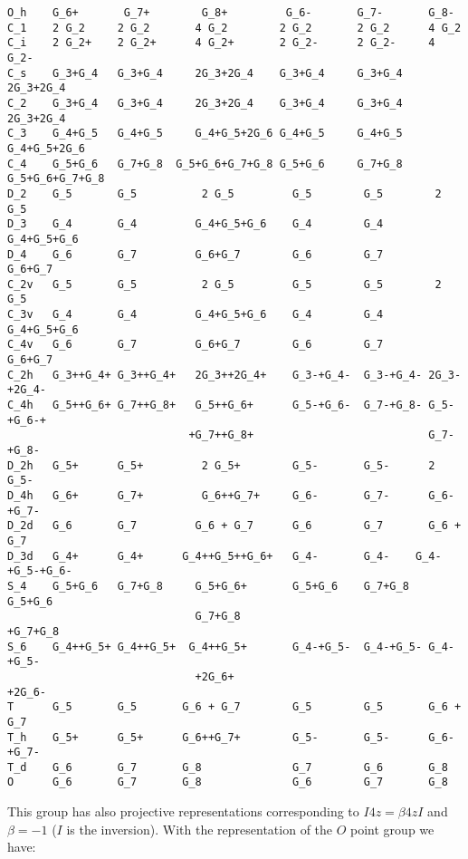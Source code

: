 \documentclass[12pt,a4paper,twoside]{report}
\begin{document}
\begin{tcolorbox}
\begin{scriptsize}
\begin{verbatim}
O_h    G_6+       G_7+        G_8+         G_6-       G_7-       G_8-
C_1    2 G_2     2 G_2       4 G_2        2 G_2       2 G_2      4 G_2
C_i    2 G_2+    2 G_2+      4 G_2+       2 G_2-      2 G_2-     4 G_2-
C_s    G_3+G_4   G_3+G_4     2G_3+2G_4    G_3+G_4     G_3+G_4   2G_3+2G_4
C_2    G_3+G_4   G_3+G_4     2G_3+2G_4    G_3+G_4     G_3+G_4   2G_3+2G_4
C_3    G_4+G_5   G_4+G_5     G_4+G_5+2G_6 G_4+G_5     G_4+G_5   G_4+G_5+2G_6
C_4    G_5+G_6   G_7+G_8  G_5+G_6+G_7+G_8 G_5+G_6     G_7+G_8 G_5+G_6+G_7+G_8
D_2    G_5       G_5          2 G_5         G_5        G_5        2 G_5
D_3    G_4       G_4         G_4+G_5+G_6    G_4        G_4       G_4+G_5+G_6
D_4    G_6       G_7         G_6+G_7        G_6        G_7       G_6+G_7
C_2v   G_5       G_5          2 G_5         G_5        G_5        2 G_5
C_3v   G_4       G_4         G_4+G_5+G_6    G_4        G_4       G_4+G_5+G_6
C_4v   G_6       G_7         G_6+G_7        G_6        G_7       G_6+G_7
C_2h   G_3++G_4+ G_3++G_4+   2G_3++2G_4+    G_3-+G_4-  G_3-+G_4- 2G_3-+2G_4- 
C_4h   G_5++G_6+ G_7++G_8+   G_5++G_6+      G_5-+G_6-  G_7-+G_8- G_5-+G_6-+
                            +G_7++G_8+                           G_7-+G_8- 
D_2h   G_5+      G_5+         2 G_5+        G_5-       G_5-      2 G_5-
D_4h   G_6+      G_7+         G_6++G_7+     G_6-       G_7-      G_6-+G_7-
D_2d   G_6       G_7         G_6 + G_7      G_6        G_7       G_6 + G_7
D_3d   G_4+      G_4+      G_4++G_5++G_6+   G_4-       G_4-    G_4-+G_5-+G_6-
S_4    G_5+G_6   G_7+G_8     G_5+G_6+       G_5+G_6    G_7+G_8   G_5+G_6
                             G_7+G_8                             +G_7+G_8
S_6    G_4++G_5+ G_4++G_5+  G_4++G_5+       G_4-+G_5-  G_4-+G_5- G_4-+G_5-
                             +2G_6+                               +2G_6-
T      G_5       G_5       G_6 + G_7        G_5        G_5       G_6 + G_7
T_h    G_5+      G_5+      G_6++G_7+        G_5-       G_5-      G_6-+G_7-
T_d    G_6       G_7       G_8              G_7        G_6       G_8
O      G_6       G_7       G_8              G_6        G_7       G_8    
\end{verbatim}
\end{scriptsize}
\end{tcolorbox}

This group has also projective representations corresponding to
$I {4z} = \beta {4z} I$ and $\beta=-1$ ($I$ is the inversion). With
the representation of the $O$ point group we have:
\end{document}
